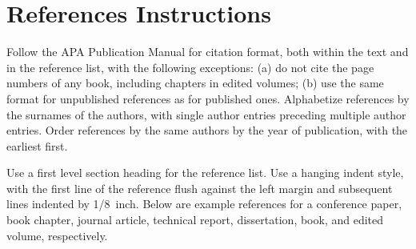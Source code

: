 \documentclass[10pt,letterpaper]{article}
\begin{document}
\section{References Instructions}

Follow the APA Publication Manual for citation format, both within the
text and in the reference list, with the following exceptions: (a) do
not cite the page numbers of any book, including chapters in edited
volumes; (b) use the same format for unpublished references as for
published ones. Alphabetize references by the surnames of the authors,
with single author entries preceding multiple author entries. Order
references by the same authors by the year of publication, with the
earliest first.

Use a first level section heading for the reference list. Use a
hanging indent style, with the first line of the reference flush
against the left margin and subsequent lines indented by 1/8~inch.
Below are example references for a conference paper, book chapter,
journal article, technical report, dissertation, book, and edited
volume, respectively.

\nocite{ChalnickBillman1988a}
\nocite{Feigenbaum1963a}
\nocite{Hill1983a}
\nocite{OhlssonLangley1985a}
\nocite{Lewis1978a}
\nocite{NewellSimon1972a}
\nocite{ShragerLangley1990a}




\setlength{\bibleftmargin}{.125in}
\setlength{\bibindent}{-\bibleftmargin}


\end{document}
